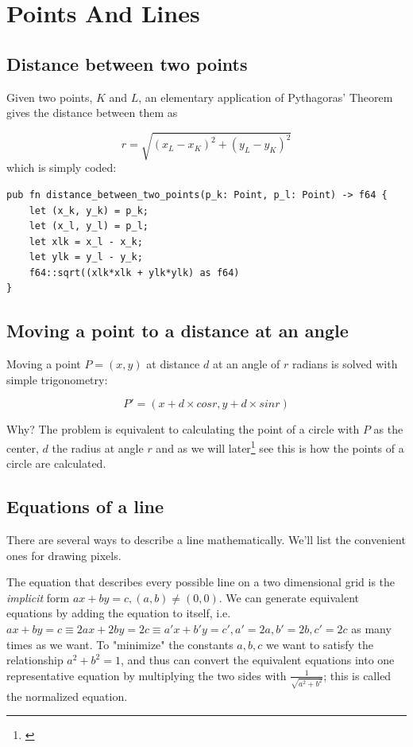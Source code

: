 \documentclass[12pt,openany,a4,usenames,dvipsnames]{book}
\newcommand\pixels{{\pixelfont{}pixels}}
\begin{document}
\part{Points And Lines}
\chapter{Distance between two points}

\begin{figure}[H]
\centering

\end{figure}

Given two points, $K$ and $L$, an elementary application of Pythagoras' Theorem gives the distance between them as

\begin{equation}
  r = \sqrt{(x_{L} - x_{K})^{2} +(y_{L} - y_{K})^{2}}
\end{equation}
which is simply coded:
\begin{verbatim}
pub fn distance_between_two_points(p_k: Point, p_l: Point) -> f64 {
    let (x_k, y_k) = p_k;
    let (x_l, y_l) = p_l;
    let xlk = x_l - x_k;
    let ylk = y_l - y_k;
    f64::sqrt((xlk*xlk + ylk*ylk) as f64)
}
\end{verbatim}
\chapter{Moving a point to a distance at an angle}

Moving a point $P=(x,y)$ at distance $d$ at an angle of $r$ radians is solved with simple trigonometry:

$$P'=(x+d\times{}cosr, y+d\times{}sinr)$$

Why? The problem is equivalent to calculating the point of a circle with $P$ as the center, $d$ the radius at angle $r$ and as we will later\footnote{\emph{ \pageref{ch:equations-circles}}} see this is how the points of a circle are calculated.

\chapter{Equations of a line}\label{ch:equations-lines}
There are several ways to describe a line mathematically. We'll list the convenient ones for drawing \pixels{}.

The equation that describes every possible line on a two dimensional grid is the \emph{implicit} form $ax+by=c, (a,b) \neq{} (0,0)$. We can generate equivalent equations by adding the equation to itself, i.e. $ax+by=c \equiv 2ax+2by=2c \equiv a'x+b'y=c', a'=2a, b'=2b, c'=2c$ as many times as we want. To "minimize" the constants $a,b,c$ we want to satisfy the relationship $a^{2}+b^{2}=1$, and thus can convert the equivalent equations into one representative equation by multiplying the two sides with $\frac{1}{\sqrt{a^2+b^2}}$; this is called the normalized equation. %
\end{document}
